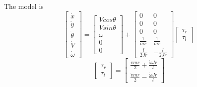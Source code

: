 \begin{tcolorbox}[title=Dynamic Model]
The model is
\begin{equation}
	\begin{bmatrix}
		\Dot{x}\\
		\Dot{y}\\
		\Dot{\theta}\\
		\Dot{V}\\
		\Dot{\omega}
	\end{bmatrix}=
	\begin{bmatrix}
		V cos\theta\\
		V sin\theta\\
		\omega\\
		0\\
		0
	\end{bmatrix}+
	\begin{bmatrix}
		0& 0 \\
		0& 0 \\
		0& 0 \\
		\frac{1}{mr}& \frac{1}{mr} \\
		\frac{l}{2Jr}&-\frac{l}{2Jr}
	\end{bmatrix}\begin{bmatrix}
		\tau_r\\
		\tau_l
	\end{bmatrix}
\end{equation}
\begin{equation}
	\begin{bmatrix}
		\tau_r \\
		\tau_l
	\end{bmatrix}=
	\begin{bmatrix}
		\frac{\dot{v}mr}{2} + \frac{\dot{\omega}Jr}{l} \\
		\frac{\dot{v}mr}{2} - \frac{\dot{\omega}Jr}{l}
	\end{bmatrix}
\end{equation}
\end{tcolorbox}